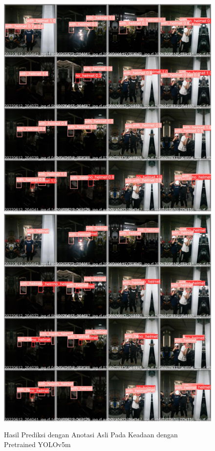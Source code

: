 \begin{figure}[ht]
  \centering
  \includegraphics[scale=0.1]{gambar/train_v2_val/low_ligjt/yololarge/val_batch0_pred.jpg}
  \includegraphics[scale=0.1]{gambar/train_v2_val/low_ligjt/yololarge/val_batch0_labels.jpg}
  \caption{Hasil Prediksi dengan Anotasi Asli Pada Keadaan dengan Pretrained YOLOv5m}
\end{figure}

